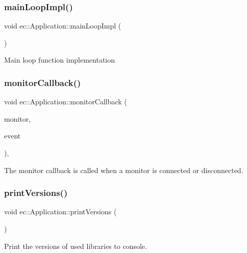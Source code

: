 \subsubsection{\texorpdfstring{main\+Loop\+Impl()}{mainLoopImpl()}}
{\footnotesize\ttfamily void ec\+::\+Application\+::main\+Loop\+Impl (\begin{DoxyParamCaption}{ }\end{DoxyParamCaption})\hspace{0.3cm}{\ttfamily [virtual]}}

Main loop function implementation \mbox{\label{classec_1_1_application_adaeb3f63d8e850d7b83f1c1b61bc73d1}} 
\subsubsection{\texorpdfstring{monitor\+Callback()}{monitorCallback()}}
{\footnotesize\ttfamily void ec\+::\+Application\+::monitor\+Callback (\begin{DoxyParamCaption}\item[{G\+L\+F\+Wmonitor $\ast$}]{monitor,  }\item[{int}]{event }\end{DoxyParamCaption})\hspace{0.3cm}{\ttfamily [static]}, {\ttfamily [protected]}}

The monitor callback is called when a monitor is connected or disconnected. \mbox{\label{classec_1_1_application_a329a3b03c23e5aba31bbbb175930dbae}} 
\subsubsection{\texorpdfstring{print\+Versions()}{printVersions()}}
{\footnotesize\ttfamily void ec\+::\+Application\+::print\+Versions (\begin{DoxyParamCaption}{ }\end{DoxyParamCaption})\hspace{0.3cm}{\ttfamily [static]}}

Print the versions of used libraries to console. \mbox{\label{classec_1_1_application_a4fe5dcd06017ba4322eca3adec47e03e}} 
